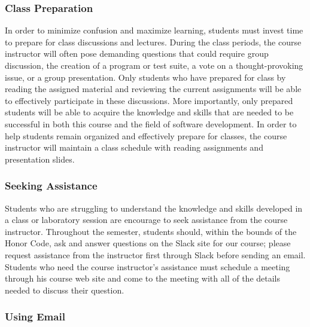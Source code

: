 \subsubsection*{Class Preparation}

In order to minimize confusion and maximize learning, students must invest time to prepare for class discussions and
lectures.  During the class periods, the course instructor will often pose demanding questions that could require group
discussion, the creation of a program or test suite, a vote on a thought-provoking issue, or a group presentation.
Only students who have prepared for class by reading the assigned material and reviewing the current assignments will be
able to effectively participate in these discussions.  More importantly, only prepared students will be able to acquire
the knowledge and skills that are needed to be successful in both this course and the field of software development.  In
order to help students remain organized and effectively prepare for classes, the course instructor will maintain a class
schedule with reading assignments and presentation slides.


\subsubsection*{Seeking Assistance}

Students who are struggling to understand the knowledge and skills developed in a class or laboratory session are
encourage to seek assistance from the course instructor. Throughout the semester, students
should, within the bounds of the Honor Code, ask and answer questions on the Slack site for our course; please request
assistance from the instructor first through Slack before sending an email. Students who need the course
instructor's assistance must schedule a meeting through his course web site and come to the meeting with all of the
details needed to discuss their question.

\subsubsection*{Using Email}

